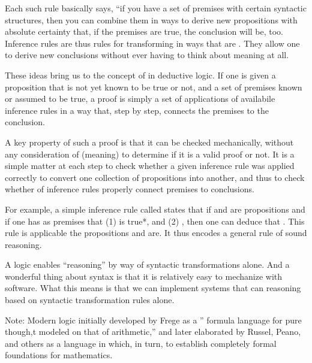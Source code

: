 \documentclass[letterpaper,10pt,english]{sphinxmanual}
\begin{document}
Each such rule basically says, “if you have a set of premises with
certain syntactic structures, then you can combine them in ways to
derive new propositions with absolute certainty that, if the premises
are true, the conclusion will be, too.  Inference rules are thus rules
for transforming  in ways that are . They
allow one to derive  new conclusions without ever having
to think about meaning at all.

These ideas bring us to the concept of  in deductive logic. If
one is given a proposition that is not yet known to be true or not,
and a set of premises known or assumed to be true, a proof is simply a
set of applications of availabile inference rules in a way that, step
by step, connects the premises  to the conclusion.

A key property of such a proof is that it can be checked mechanically,
without any consideration of  (meaning) to determine if it
is a valid proof or not. It is a simple matter at each step to check
whether a given inference rule was applied correctly to convert one
collection of propositions into another, and thus to check whether
 of inference rules properly connect premises to conclusions.

For example, a simple inference rule called  states that
if  and  are propositions and if one has as premises that (1)
 is true*, and (2) , then one can
deduce that . This rule is applicable  the
propositions  and  are. It thus encodes a general rule of sound
reasoning.

A logic enables  “reasoning” by way of syntactic
transformations alone. And a wonderful thing about syntax is that it
is relatively easy to mechanize with software. What this means is that
we can implement systems that can reasoning  based on
syntactic transformation rules alone.

Note: Modern logic initially developed by Frege as a ” formula
language for pure though,t modeled on that of arithmetic,” and later
elaborated by Russel, Peano, and others as a language in which, in
turn, to establish completely formal foundations for mathematics.
\end{document}
